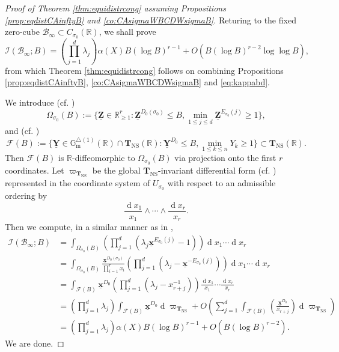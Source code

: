 \documentclass[11pt,letterpaper]{amsart}
\newcommand{\BG}{{\mathbb {G}}}
\newcommand{\BR}{{\mathbb {R}}}
\newcommand{\CB}{{\mathcal {B}}}
\newcommand{\CF}{{\mathcal {F}}}
\newcommand{\CI}{{\mathcal {I}}}
\newcommand{\xx}{\underline{\mathbf{x}}}
\newcommand{\YY}{\underline{\mathbf{Y}}}
\newcommand{\ZZ}{\underline{\mathbf{Z}}}
\newcommand{\CTNS}{\mathbf{T}_{\operatorname{NS}}}
\theoremstyle{plain}
\numberwithin{equation}{section}
\theoremstyle{definition}
\theoremstyle{remark}
\begin{document}
\begin{proof}[Proof of Theorem \ref{thm:equidistrcong} assuming Propositions \ref{prop:eqdistCAinftyB} and \ref{co:CAsigmaWBCDWsigmaB}]
Returing to the fixed zero-cube $\CB_\infty\subset C_{\sigma_0}(\BR)$, we shall prove 
$$\CI(\CB_\infty;B)=\left(\prod_{j=1}^{d}\lambda_{j}\right)\alpha(X)B(\log B)^{r-1}+O(B(\log B)^{r-2}\log\log B),$$ 
from which Theorem \ref{thm:equidistrcong} follows on combining Propositions \ref{prop:eqdistCAinftyB}, \ref{co:CAsigmaWBCDWsigmaB} and \eqref{eq:kappabd}.

We introduce (cf. \cite[11.34]{Salberger})
\begin{equation}\label{eq:OmegasigmaB}
	\Omega_{\sigma_0}(B):=\{\ZZ\in\BR_{\geqslant 1}^r:\ZZ^{D_0(\sigma_0)}\leqslant B,\min_{1\leqslant j\leqslant d}\ZZ^{E_{\sigma_0}(j)}\geqslant 1\},
\end{equation} and (cf. \cite[11.37]{Salberger})
\begin{equation}\label{eq:CFB}
	\CF(B):=\{\YY\in \BG_{\operatorname{m}}^{\triangle(1)}(\BR)\cap \CTNS(\BR):\YY^{D_0}\leqslant B,\min_{1\leqslant k\leqslant n}Y_k\geqslant 1\}\subset \CTNS(\BR).
\end{equation}
Then $\CF(B)$ is $\BR$-diffeomorphic to $\Omega_{\sigma_0}(B)$ via projection onto the first $r$ coordinates.
Let $\varpi_{\CTNS}$ be the global $\CTNS$-invariant differential form (cf. \cite[(1.13) and Lemma 11.38]{Salberger}) represented in the coordinate system of $U_{\sigma_0}$ with respect to an admissible ordering by $$\frac{\operatorname{d}x_1}{x_1}\wedge\cdots\wedge\frac{\operatorname{d}x_r}{x_r}.$$ Then we compute, in a similar manner as in \cite[11.33--11.41]{Salberger}, 
\begin{align*}
	\CI(\CB_\infty;B) &=\int_{\Omega_{\sigma_0}(B)}\left(\prod_{j=1}^{d}(\lambda_{j}\xx^{E_{\sigma_0}(j)}-1)\right)\operatorname{d}x_1\cdots\operatorname{d}x_r\\&=\int_{\Omega_{\sigma_0}(B)}\frac{\xx^{D_0(\sigma_0)}}{\prod_{i=1}^{r}x_i}\left(\prod_{j=1}^{d}(\lambda_{j}-\xx^{-E_{\sigma_0}(j)})\right)\operatorname{d}x_1\cdots\operatorname{d}x_r\\&=\int_{\CF(B)}\xx^{D_0}\left(\prod_{j=1}^{d}(\lambda_{j}-x^{-1}_{r+j})\right)\frac{\operatorname{d}x_1}{x_1}\cdots\frac{\operatorname{d}x_r}{x_r}\\&=\left(\prod_{j=1}^{d}\lambda_{j}\right)\int_{\CF(B)}\xx^{D_0}\operatorname{d}\varpi_{\CTNS}+O\left(\sum_{j=1}^{d}\int_{\CF(B)}\left(\frac{\xx^{D_0}}{x_{r+j}}\right)\operatorname{d}\varpi_{\CTNS}\right)\\ &=\left(\prod_{j=1}^{d}\lambda_{j}\right)\alpha(X)B(\log B)^{r-1}+O(B(\log B)^{r-2}).
\end{align*}
We are done.
\end{proof}
\end{document}
